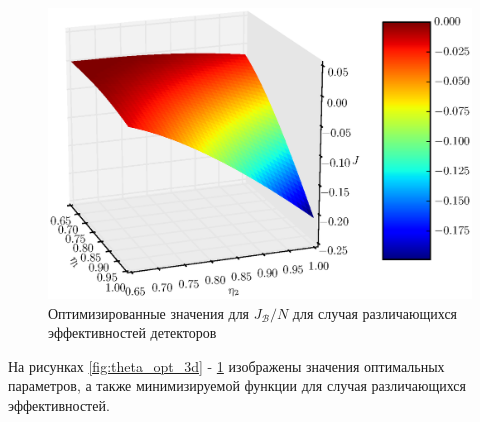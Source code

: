 \documentclass[%
master,         %
subf,           %
href,           %
colorlinks=true %
]{disser}
\numberwithin{equation}{section}
\numberwithin{figure}{section}
\begin{document}
\begin{figure}[t]
\includegraphics[scale=0.7]{J3d.eps}
\caption{Оптимизированные значения для $J_{\mathcal{B}}/N$ для случая различающихся эффективностей детекторов}
\label{fig:J_opt_3d}
\end{figure}

На рисунках \ref{fig:theta_opt_3d} - \ref{fig:J_opt_3d} изображены значения оптимальных параметров, а также минимизируемой функции для случая различающихся эффективностей.

\begingroup
\small
\end{document}
